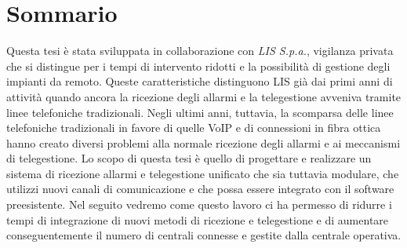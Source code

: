 \newpage
\chapter*{Sommario}


Questa tesi è stata sviluppata in collaborazione con \emph{LIS S.p.a.}, vigilanza privata che si distingue per i tempi di intervento ridotti e la possibilità di gestione degli impianti da remoto. Queste caratteristiche distinguono LIS già dai primi anni di attività quando ancora la ricezione degli allarmi e la telegestione avveniva tramite linee telefoniche tradizionali.
Negli ultimi anni, tuttavia, la scomparsa delle linee telefoniche tradizionali in favore di quelle VoIP e di connessioni in fibra ottica hanno creato diversi problemi alla normale ricezione degli allarmi e ai meccanismi di telegestione.
Lo scopo di questa tesi è quello di progettare e realizzare un sistema di ricezione allarmi e telegestione unificato che sia tuttavia modulare, che utilizzi nuovi canali di comunicazione e che possa essere integrato con il software preesistente.
Nel seguito vedremo come questo lavoro ci ha permesso di ridurre i tempi di integrazione di nuovi metodi di ricezione e telegestione e di aumentare conseguentemente il numero di centrali connesse e gestite dalla centrale operativa.
